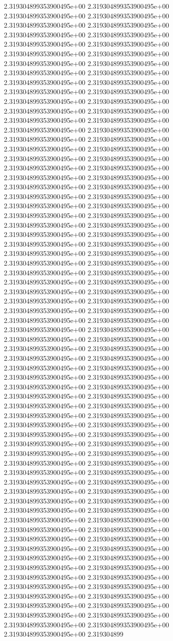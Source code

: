 2.319304899353900495e+00	2.319304899353900495e+00	2.319304899353900495e+00	2.319304899353900495e+00	2.319304899353900495e+00	2.319304899353900495e+00	2.319304899353900495e+00	2.319304899353900495e+00	2.319304899353900495e+00	2.319304899353900495e+00	2.319304899353900495e+00	2.319304899353900495e+00	2.319304899353900495e+00	2.319304899353900495e+00	2.319304899353900495e+00	2.319304899353900495e+00	2.319304899353900495e+00	2.319304899353900495e+00	2.319304899353900495e+00	2.319304899353900495e+00	2.319304899353900495e+00	2.319304899353900495e+00	2.319304899353900495e+00	2.319304899353900495e+00	2.319304899353900495e+00	2.319304899353900495e+00	2.319304899353900495e+00	2.319304899353900495e+00	2.319304899353900495e+00	2.319304899353900495e+00	2.319304899353900495e+00	2.319304899353900495e+00	2.319304899353900495e+00	2.319304899353900495e+00	2.319304899353900495e+00	2.319304899353900495e+00	2.319304899353900495e+00	2.319304899353900495e+00	2.319304899353900495e+00	2.319304899353900495e+00	2.319304899353900495e+00	2.319304899353900495e+00	2.319304899353900495e+00	2.319304899353900495e+00	2.319304899353900495e+00	2.319304899353900495e+00	2.319304899353900495e+00	2.319304899353900495e+00	2.319304899353900495e+00	2.319304899353900495e+00	2.319304899353900495e+00	2.319304899353900495e+00	2.319304899353900495e+00	2.319304899353900495e+00	2.319304899353900495e+00	2.319304899353900495e+00	2.319304899353900495e+00	2.319304899353900495e+00	2.319304899353900495e+00	2.319304899353900495e+00	2.319304899353900495e+00	2.319304899353900495e+00	2.319304899353900495e+00	2.319304899353900495e+00	2.319304899353900495e+00	2.319304899353900495e+00	2.319304899353900495e+00	2.319304899353900495e+00	2.319304899353900495e+00	2.319304899353900495e+00	2.319304899353900495e+00	2.319304899353900495e+00	2.319304899353900495e+00	2.319304899353900495e+00	2.319304899353900495e+00	2.319304899353900495e+00	2.319304899353900495e+00	2.319304899353900495e+00	2.319304899353900495e+00	2.319304899353900495e+00	2.319304899353900495e+00	2.319304899353900495e+00	2.319304899353900495e+00	2.319304899353900495e+00	2.319304899353900495e+00	2.319304899353900495e+00	2.319304899353900495e+00	2.319304899353900495e+00	2.319304899353900495e+00	2.319304899353900495e+00	2.319304899353900495e+00	2.319304899353900495e+00	2.319304899353900495e+00	2.319304899353900495e+00	2.319304899353900495e+00	2.319304899353900495e+00	2.319304899353900495e+00	2.319304899353900495e+00	2.319304899353900495e+00	2.319304899353900495e+00	2.319304899353900495e+00	2.319304899353900495e+00	2.319304899353900495e+00	2.319304899353900495e+00	2.319304899353900495e+00	2.319304899353900495e+00	2.319304899353900495e+00	2.319304899353900495e+00	2.319304899353900495e+00	2.319304899353900495e+00	2.319304899353900495e+00	2.319304899353900495e+00	2.319304899353900495e+00	2.319304899353900495e+00	2.319304899353900495e+00	2.319304899353900495e+00	2.319304899353900495e+00	2.319304899353900495e+00	2.319304899353900495e+00	2.319304899353900495e+00	2.319304899353900495e+00	2.319304899353900495e+00	2.319304899353900495e+00	2.319304899353900495e+00	2.319304899353900495e+00	2.319304899353900495e+00	2.319304899353900495e+00	2.319304899353900495e+00	2.319304899353900495e+00	2.319304899353900495e+00	2.319304899353900495e+00	2.319304899353900495e+00	2.319304899353900495e+00	2.319304899
